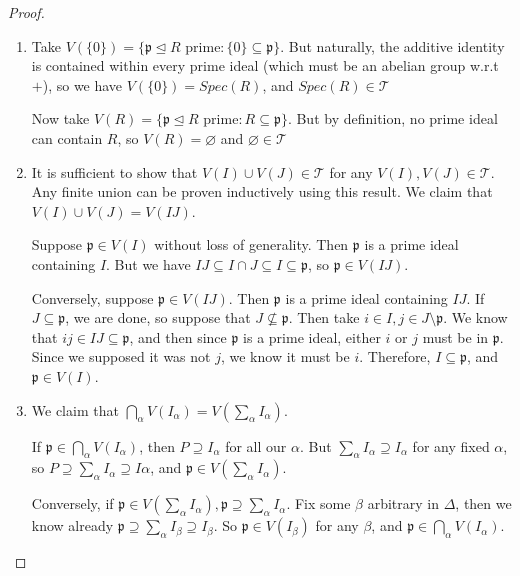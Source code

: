 \documentclass{article}
\theoremstyle{plain}%
\newtheorem[L]{thm}{Theorem}[section]
\newtheorem[L]{lem}[thm]{Lemma}
\newtheorem[L]{prop}[thm]{Proposition}
\theoremstyle{definition}
\newtheorem[M]{defn}{Definition}[section]
\newtheorem[M]{exmp}{Example}[section]
\theoremstyle{remark}
\begin{document}
\begin{proof} 
\begin{enumerate}
\item Take $V(\{0\} )=\{\mathfrak{p}\trianglelefteq R \text{ prime}: \{0\} \subseteq \mathfrak{p}\} $. But naturally, the additive identity is contained within every prime ideal (which must be an abelian group w.r.t $+$), so we have  $V(\{0\} )=Spec(R)$, and $Spec(R)\in \mathcal{T}$

Now take $V(R)=\{\mathfrak{p}\trianglelefteq R \text{ prime}: R\subseteq \mathfrak{p}\} $. But by definition, no prime ideal can contain $R$, so $V(R)=\varnothing$ and $\varnothing\in \mathcal{T}$
\item It is sufficient to show that $V(I)\cup V(J)\in \mathcal{T}$ for any $V(I),V(J)\in \mathcal{T}$. Any finite union can be proven inductively using this result. We claim that $V(I)\cup V(J)=V(IJ)$.

    Suppose $\mathfrak{p}\in V(I)$ without loss of generality. Then $\mathfrak{p}$ is a prime ideal containing $I$. But we have $IJ\subseteq I\cap J\subseteq I\subseteq \mathfrak{p}$, so $\mathfrak{p}\in V(IJ)$.

    Conversely, suppose $\mathfrak{p}\in V(IJ)$. Then $\mathfrak{p}$ is a prime ideal containing $IJ$. If $J\subseteq \mathfrak{p}$, we are done, so suppose that $J\not\subseteq \mathfrak{p}$. Then take $i\in I,j\in J\setminus \mathfrak{p}$. We know that $ij\in IJ\subseteq \mathfrak{p}$, and then since $\mathfrak{p}$ is a prime ideal, either $i$ or $j$ must be in $\mathfrak{p}$. Since we supposed it was not $j$, we know it must be $i$. Therefore, $I\subseteq \mathfrak{p}$, and $\mathfrak{p}\in V(I)$.

\item We claim that $\bigcap_{\alpha} V(I_{\alpha})=V\left(\sum_{\alpha}^{} I_\alpha\right)$.

    If $\mathfrak{p}\in \bigcap_{\alpha} V(I_\alpha)$, then $P\supseteq I_\alpha$ for all our $\alpha$. But $\sum_{\alpha}^{} I_\alpha\supseteq I_\alpha$ for any fixed $\alpha$, so $P\supseteq \sum_{\alpha}^{} I_\alpha\supseteq I\alpha$, and $\mathfrak{p}\in V\left( \sum_{\alpha}^{} I_\alpha \right) $.

    Conversely, if $\mathfrak{p}\in V\left( \sum_{\alpha}^{} I_\alpha \right), \mathfrak{p} \supseteq \sum_{\alpha}^{} I_\alpha$. Fix some  $\beta$ arbitrary in $\Delta$, then we know already $\mathfrak{p}\supseteq \sum_{\alpha}^{} I_\beta\supseteq I_\beta $. So $\mathfrak{p}\in V(I_\beta)$ for any $\beta$, and $\mathfrak{p}\in \bigcap_{\alpha}V(I_\alpha) $.

\end{enumerate}
\end{proof}
\end{document}
